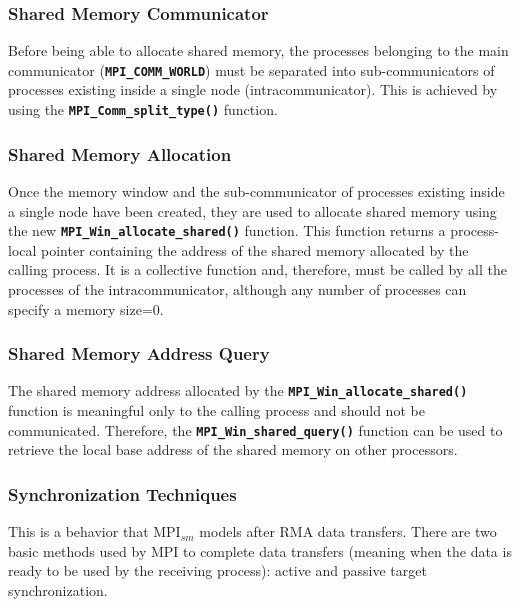 \subsubsection*{Shared Memory Communicator}

Before being able to allocate shared memory, the processes belonging to the main communicator (\textbf{\texttt{MPI\_COMM\_WORLD}}) must be separated into sub-communicators of processes existing inside a single node (intracommunicator). This is achieved by using the \textbf{\texttt{MPI\_Comm\_split\_type()}} function.

 

\subsubsection*{Shared Memory Allocation}

Once the memory window and the sub-communicator of processes existing inside a single node have been created, they are used to allocate shared memory using the new \textbf{\texttt{MPI\_Win\_allocate\_shared()}} function. This function returns a process-local pointer containing the address of the shared memory allocated by the calling process. It is a collective function and, therefore, must be called by all the processes of the intracommunicator, although any number of processes can specify a memory size=0.

\subsubsection*{Shared Memory Address Query}

The shared memory address allocated by the \textbf{\texttt{MPI\_Win\_allocate\_shared()}} function is meaningful only to the calling process and should not be communicated. Therefore, the \textbf{\texttt{MPI\_Win\_shared\_query()}} function can be used to retrieve the local base address of the shared memory on other processors.


\subsubsection*{Synchronization Techniques}

This is a behavior that MPI$_{sm}$ models after RMA data transfers. There are two basic methods used by MPI to complete data transfers (meaning when the data is ready to be used by the receiving process): active and passive target synchronization. 

\medskip

